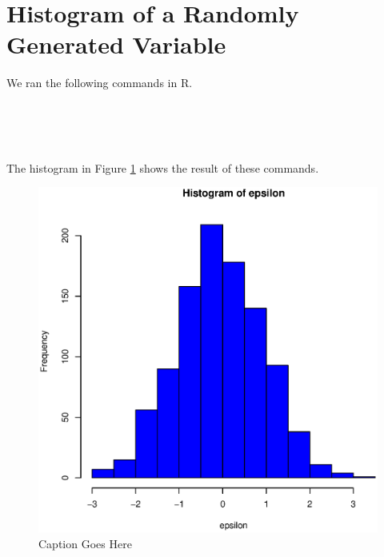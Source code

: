 \documentclass[11pt]{book}
\begin{document}
\section*{Histogram of a Randomly Generated Variable}

We ran the following commands in R.

\begin{lstlisting}[language=R]


    
\end{lstlisting}


The histogram in Figure \ref{fig:example} shows the result of these commands.

\begin{figure}
\centering
\includegraphics[width=\textwidth]{Figures/name_of_figure.eps}
\caption{Caption Goes Here}
\label{fig:example}
\end{figure}
\end{document}
